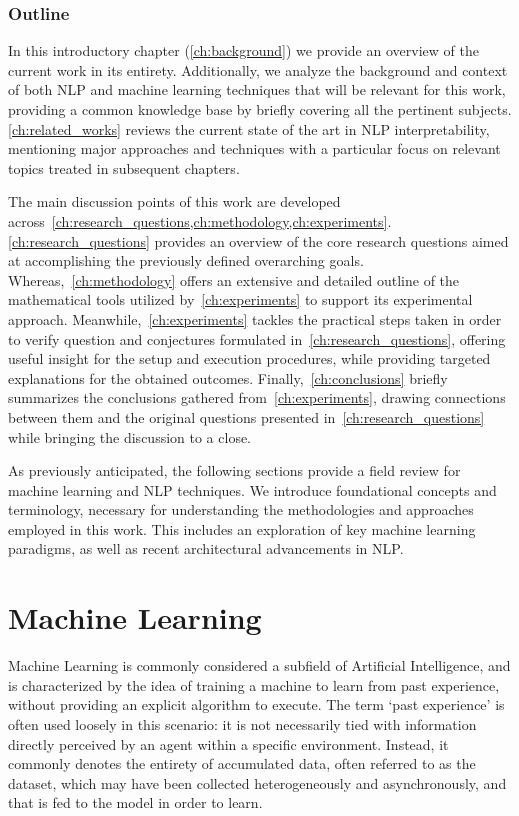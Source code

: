 \subsubsection*{Outline}

In this introductory chapter (\cref{ch:background}) we provide an overview of the current work in its entirety.
Additionally, we analyze the background and context of both NLP and machine learning techniques that will be relevant for this work, providing a common knowledge base by briefly covering all the pertinent subjects.
\cref{ch:related_works} reviews the current state of the art in NLP interpretability, mentioning major approaches and techniques with a particular focus on relevant topics treated in subsequent chapters.

The main discussion points of this work are developed across~\cref{ch:research_questions,ch:methodology,ch:experiments}.
\cref{ch:research_questions} provides an overview of the core research questions aimed at accomplishing the previously defined overarching goals.
Whereas,~\cref{ch:methodology} offers an extensive and detailed outline of the mathematical tools utilized by~\cref{ch:experiments} to support its experimental approach.
Meanwhile,~\cref{ch:experiments} tackles the practical steps taken in order to verify question and conjectures formulated in~\cref{ch:research_questions}, offering useful insight for the setup and execution procedures, while providing targeted explanations for the obtained outcomes.
Finally,~\cref{ch:conclusions} briefly summarizes the conclusions gathered from~\cref{ch:experiments}, drawing connections between them and the original questions presented in~\cref{ch:research_questions} while bringing the discussion to a close.

\vspace{1.5em}
\noindent As previously anticipated, the following sections provide a field review for machine learning and NLP techniques.
We introduce foundational concepts and terminology, necessary for understanding the methodologies and approaches employed in this work.
This includes an exploration of key machine learning paradigms, as well as recent architectural advancements in NLP\@.

\section{Machine Learning}

Machine Learning is commonly considered a subfield of Artificial Intelligence, and is characterized by the idea of training a machine to learn from past experience, without providing an explicit algorithm to execute.
The term `past experience' is often used loosely in this scenario: it is not necessarily tied with information directly perceived by an agent within a specific environment.
Instead, it commonly denotes the entirety of accumulated data, often referred to as the dataset, which may have been collected heterogeneously and asynchronously, and that is fed to the model in order to learn.

